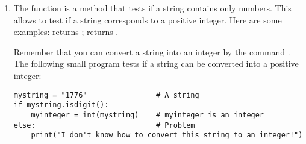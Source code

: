 \documentclass[11pt,class=report,crop=false]{standalone}
\begin{document}
\begin{cours}
\begin{enumerate}
  \item The function  is a \Python{}    method that tests if a string contains only numbers. This allows to test if a string corresponds to a positive integer.
 Here are some examples:  returns ;  returns .
 
 Remember that you can convert a string into an integer by the command . The following small program tests if a string can be converted into a positive integer:
 
\begin{lstlisting}
mystring = "1776"                # A string
if mystring.isdigit():
    myinteger = int(mystring)    # myinteger is an integer
else:                            # Problem
    print("I don't know how to convert this string to an integer!")
\end{lstlisting} 

\end{enumerate}  
\end{cours}

\end{document}
